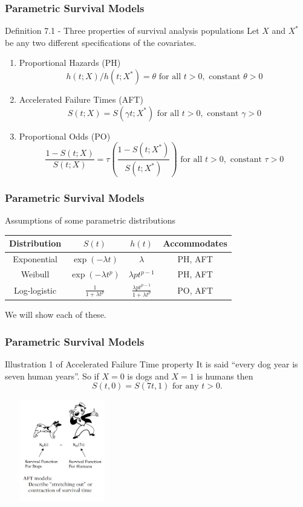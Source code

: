 \documentclass{beamer}
\theoremstyle{definition}
\begin{document}
 \begin{frame}
\frametitle{Parametric Survival Models}
\begin{block}{Definition 7.1 - Three properties of survival analysis populations}
Let $X$ and $X^*$ be any two different specifications of the covariates.
\begin{enumerate}
\item Proportional Hazards (PH)
\[ h(t;X)/h(t;X^*) = \theta \text{ for all } t>0, \text{ constant } \theta > 0 \]
\item Accelerated Failure Times (AFT)
\[ S(t;X) =  S(\gamma t;X^*)  \text{ for all } t>0, \text{ constant } \gamma > 0
\]
\item Proportional Odds (PO)
\[ \frac{1- S(t;X)}{S(t;X)} = \tau \left(\frac{1- S(t;X^*)}{S(t;X^*)}\right)  \text{ for all } t>0, \text{ constant } \tau > 0
\]
\end{enumerate}
\end{block}
\end{frame}


\begin{frame}
\frametitle{Parametric Survival Models}
\begin{block}{Assumptions of some parametric distributions }
\begin{center}
\begin{tabular}{ c c c | c }
Distribution & $S(t)$ & $h(t)$ & Accommodates \\ \hline
Exponential & $\exp(-\lambda t)$ & $\lambda$ & PH, AFT \\
Weibull  & $\exp(-\lambda t^p)$ & $\lambda p t^{p-1}$ & PH, AFT\\
Log-logistic & $\frac{1}{1+\lambda t^p}$ & $ \frac{\lambda p t^{p-1}}{1+\lambda t^p}$ & PO, AFT
\end{tabular}
\end{center}
\end{block}
We will show each of these.
\end{frame}

\begin{frame}
\frametitle{Parametric Survival Models}
\begin{block}{Illustration 1 of Accelerated Failure Time property}
It is said ``every dog year is seven human years''. So if $X=0$ is dogs and $X=1$ is humans then
\[
S(t,0) = S(7t,1) \text{ for any } t>0.
\]
\begin{center}
        \includegraphics[width=5cm, height=4.5cm]{CH7_Dogs.JPG}
    \end{center}
\end{block}
\end{frame}
\end{document}
